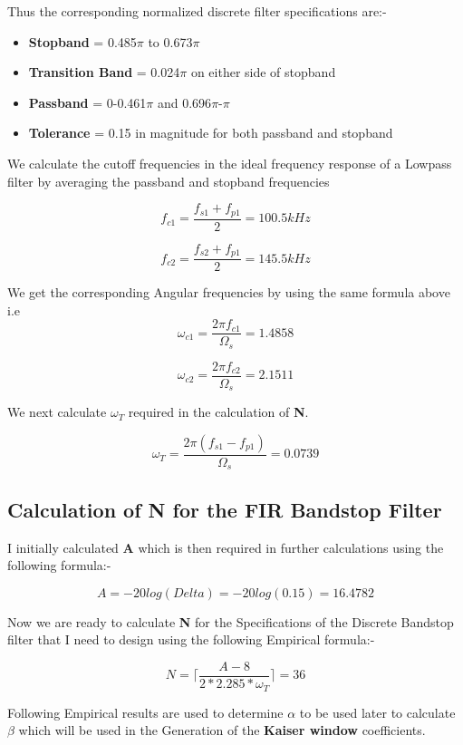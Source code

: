 \documentclass[12pt]{article}
\begin{document}
Thus the corresponding normalized discrete filter specifications are:-
\begin{itemize}
    \item \textbf{Stopband} = 0.485$\pi$ to 0.673$\pi$
    \item \textbf{Transition Band} = 0.024$\pi$ on either side of stopband
    \item \textbf{Passband} = 0-0.461$\pi$ and 0.696$\pi$-$\pi$
    \item\textbf{Tolerance} = 0.15 in magnitude for both passband and stopband
\end{itemize}

\newpage

We calculate the cutoff frequencies in the ideal frequency response of a Lowpass filter by averaging the passband and stopband frequencies

\[f_{c1} = \frac{f_{s1} + f_{p1}}{2} = 100.5 kHz\]

\[f_{c2} = \frac{f_{s2} + f_{p1}}{2} = 145.5 kHz\]

We get the corresponding Angular frequencies by using the same formula above i.e
\[\omega_{c1} = \frac{2\pi f_{c1}}{\Omega_{s}} = 1.4858\]

\[\omega_{c2} = \frac{2\pi f_{c2}}{\Omega_{s}} = 2.1511\]

We next calculate $\omega_{T}$ required in the calculation of \textbf{N}.

\[\omega_{T} = \frac{2\pi(f_{s1} - f_{p1})}{\Omega_{s}} = 0.0739\]

\subsection{Calculation of N for the FIR Bandstop Filter}

I initially calculated \textbf{A} which is then required in further calculations using the following formula:- 

\[A = -20log(Delta) = -20log(0.15) = 16.4782\]

Now we are ready to calculate \textbf{N} for the Specifications of the Discrete Bandstop filter that I need to design using the following Empirical formula:- 

\[N = \lceil \frac{A - 8}{2*2.285*\omega_{T}} \rceil = 36\]

Following Empirical results are used to determine $\alpha$ to be used later to calculate $\beta$ which will be used in the Generation of the \textbf{Kaiser window} coefficients.

\newpage
\end{document}
